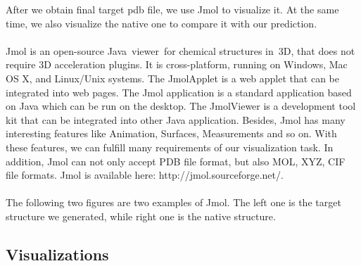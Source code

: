 \documentclass{article}
\begin{document}
   After we obtain final target pdb file, we use Jmol to visualize it. At the same time, we also visualize the native one to compare it with our prediction.\\\\
Jmol is an open-source Java viewer for chemical structures in 3D, that does not require 3D acceleration plugins. It is cross-platform, running on Windows, Mac OS X, and Linux/Unix systems. The JmolApplet is a web applet that can be integrated into web pages. The Jmol application is a standard application based on Java which can be run on the desktop. The JmolViewer is a development tool kit that can be integrated into other Java application. Besides, Jmol has many interesting features like Animation, Surfaces, Measurements and so on. With these features, we can fulfill many requirements of our visualization task. In addition, Jmol can not only accept PDB file format, but also MOL, XYZ, CIF file formats. Jmol is available here: http://jmol.sourceforge.net/.\\\\
The following two figures are two examples of Jmol. The left one is the target structure we generated, while right one is the native structure.

\subsection{Visualizations}
\end{document}
